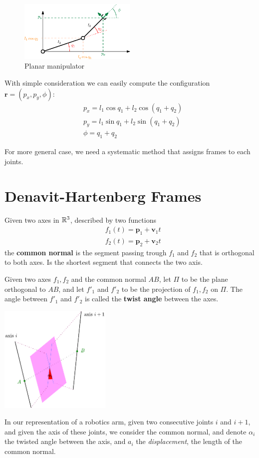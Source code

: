 \documentclass[10pt, letterpaper]{report}
\begin{document}
\begin{figure}[h!]
    \centering
    \includegraphics[width=0.5\textwidth ]{images/simple_dk.eps}
    \caption{Planar manipulator}
    \label{fig:simple_dk}
\end{figure}

With simple consideration we can easily compute the configuration $\mathbf r=(p_x,p_y,\phi)$:\begin{align}
    &p_x=l_1\cos q_1+l_2\cos(q_1+q_2)\\
    &p_y=l_1\sin q_1+l_2\sin(q_1+q_2)\\
    &\phi=q_1+q_2
\end{align}

For more general case, we need a systematic method that assigns frames to each joints.
\section{Denavit-Hartenberg Frames}
\begin{definition}
    Given two axes in ${\mathbb R}^3$, described by two functions\begin{align}
        &f_1(t)=\mathbf p_1+\mathbf v_1t\\ 
        &f_2(t)=\mathbf p_2+\mathbf v_2t
    \end{align}
    the \textbf{common normal} is the segment passing trough $f_1$ and $f_2$ that is orthogonal to both axes. Is the shortest segment that connects the two axis. 
\end{definition}
\begin{definition}
    Given two axes $f_1,f_2$ and the common normal $AB$, let $\Pi$ to be the plane orthogonal to $AB$, and let $f'_1$ and $f'_2$ to be the projection of $f_1,f_2$ on $\Pi$. The angle between $f'_1$ and $f'_2$ is called the \textbf{twist angle} between the axes.
\end{definition}
\begin{center}
    \includegraphics[width=0.4\textwidth ]{images/twist_angle.pdf}
\end{center}
In our representation of a robotics arm, given two consecutive joints $i$ and $i+1$, and given the axis of these joints, we consider the common normal, and denote $\alpha_i$ the twisted angle between the axis, and $a_i$ the \textit{displacement}, the length of the common normal.\bigskip 
\end{document}
